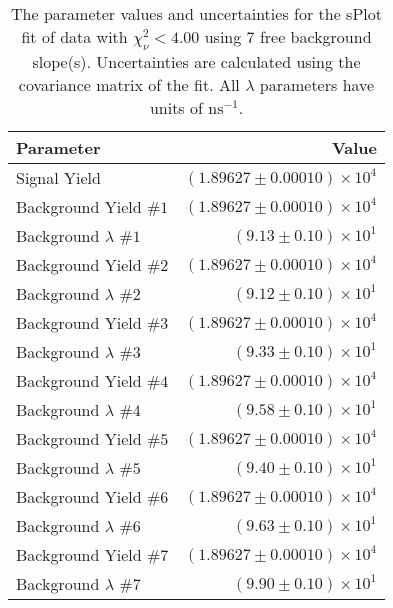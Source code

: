 
\begin{table}
    \begin{center}
        \begin{tabular}{lr}\toprule
            Parameter & Value \\\midrule
            Signal Yield & $(1.89627 \pm 0.00010) \times 10^{4}$ \\
            Background Yield $\#1$ & $(1.89627 \pm 0.00010) \times 10^{4}$ \\
            Background $\lambda$ $\#1$ & $(9.13 \pm 0.10) \times 10^{1}$ \\
            Background Yield $\#2$ & $(1.89627 \pm 0.00010) \times 10^{4}$ \\
            Background $\lambda$ $\#2$ & $(9.12 \pm 0.10) \times 10^{1}$ \\
            Background Yield $\#3$ & $(1.89627 \pm 0.00010) \times 10^{4}$ \\
            Background $\lambda$ $\#3$ & $(9.33 \pm 0.10) \times 10^{1}$ \\
            Background Yield $\#4$ & $(1.89627 \pm 0.00010) \times 10^{4}$ \\
            Background $\lambda$ $\#4$ & $(9.58 \pm 0.10) \times 10^{1}$ \\
            Background Yield $\#5$ & $(1.89627 \pm 0.00010) \times 10^{4}$ \\
            Background $\lambda$ $\#5$ & $(9.40 \pm 0.10) \times 10^{1}$ \\
            Background Yield $\#6$ & $(1.89627 \pm 0.00010) \times 10^{4}$ \\
            Background $\lambda$ $\#6$ & $(9.63 \pm 0.10) \times 10^{1}$ \\
            Background Yield $\#7$ & $(1.89627 \pm 0.00010) \times 10^{4}$ \\
            Background $\lambda$ $\#7$ & $(9.90 \pm 0.10) \times 10^{1}$ \\\bottomrule
        \end{tabular}
        \caption{The parameter values and uncertainties for the sPlot fit of data with $\chi^2_\nu < 4.00$ using 7 free background slope(s). Uncertainties are calculated using the covariance matrix of the fit. All $\lambda$ parameters have units of $\si{\nano\second}^{-1}$.}
    \end{center}
\end{table}
